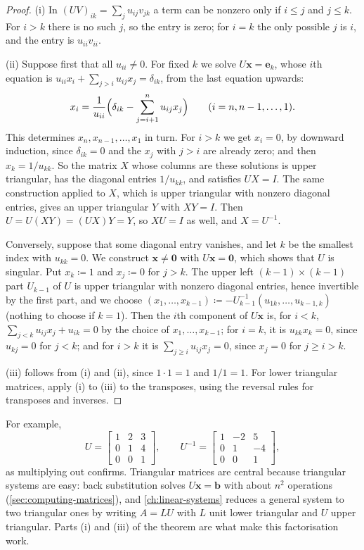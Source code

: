 \begin{proof}
(i) In $(UV)_{ik}=\sum_ju_{ij}v_{jk}$ a term can be nonzero only if $i\le j$ and $j\le k$. For $i>k$ there is no such $j$, so the entry is zero; for $i=k$ the only possible $j$ is $i$, and the entry is $u_{ii}v_{ii}$.

(ii) Suppose first that all $u_{ii}\ne0$. For fixed $k$ we solve $U\mathbf x=\mathbf e_k$, whose $i$th equation is $u_{ii}x_i+\sum_{j>i}u_{ij}x_j=\delta_{ik}$, from the last equation upwards:
\[
x_i=\frac1{u_{ii}}\Bigl(\delta_{ik}-\sum_{j=i+1}^nu_{ij}x_j\Bigr)\qquad(i=n,n-1,\ldots,1).
\]
This  determines $x_n,x_{n-1},\ldots,x_1$ in turn. For $i>k$ we get $x_i=0$, by downward induction, since $\delta_{ik}=0$ and the $x_j$ with $j>i$ are already zero; and then $x_k=1/u_{kk}$. So the matrix $X$ whose columns are these solutions is upper triangular, has the diagonal entries $1/u_{kk}$, and satisfies $UX=I$. The same construction applied to $X$, which is upper triangular with nonzero diagonal entries, gives an upper triangular $Y$ with $XY=I$. Then $U=U(XY)=(UX)Y=Y$, so $XU=I$ as well, and $X=U^{-1}$.

Conversely, suppose that some diagonal entry vanishes, and let $k$ be the smallest index with $u_{kk}=0$. We construct $\mathbf x\ne\mathbf 0$ with $U\mathbf x=\mathbf 0$, which shows that $U$ is singular. Put $x_k\coloneqq1$ and $x_j\coloneqq0$ for $j>k$. The upper left $(k-1)\times(k-1)$ part $U_{k-1}$ of $U$ is upper triangular with nonzero diagonal entries, hence invertible by the first part, and we choose $(x_1,\ldots,x_{k-1})\coloneqq-U_{k-1}^{-1}(u_{1k},\ldots,u_{k-1,k})$ (nothing to choose if $k=1$). Then the $i$th component of $U\mathbf x$ is, for $i<k$, $\sum_{j<k}u_{ij}x_j+u_{ik}=0$ by the choice of $x_1,\ldots,x_{k-1}$; for $i=k$, it is $u_{kk}x_k=0$, since $u_{kj}=0$ for $j<k$; and for $i>k$ it is $\sum_{j\ge i}u_{ij}x_j=0$, since $x_j=0$ for $j\ge i>k$.

(iii) follows from (i) and (ii), since $1\cdot1=1$ and $1/1=1$. For lower triangular matrices, apply (i) to (iii) to the transposes, using the reversal rules for transposes and inverses.
\end{proof}

For example,
\[
U=\begin{bmatrix}1&2&3\\0&1&4\\0&0&1\end{bmatrix},\qquad U^{-1}=\begin{bmatrix}1&-2&5\\0&1&-4\\0&0&1\end{bmatrix},
\]
as multiplying out confirms. Triangular matrices are central because triangular systems are easy: back substitution solves $U\mathbf x=\mathbf b$ with about $n^2$ operations (\cref{sec:computing-matrices}), and \cref{ch:linear-systems} reduces a general system to two triangular ones by writing $A=LU$ with $L$ unit lower triangular and $U$ upper triangular. Parts (i) and (iii) of the theorem are what make this factorisation work.

